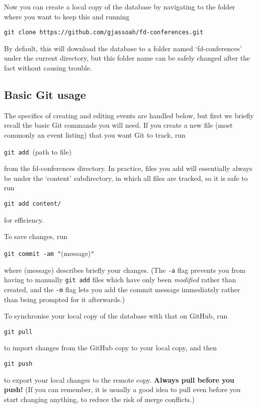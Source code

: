 \documentclass[12pt]{scrartcl}
\theoremstyle{definition}
\begin{document}
Now you can create a local copy of the database by navigating to the folder where you want to keep this and running
\begin{center}
\verb|git clone https://github.com/gjassoah/fd-conferences.git|
\end{center}
By default, this will download the database to a folder named `fd-conferences' under the current directory, but this folder name can be safely changed after the fact without causing trouble.

\subsection{Basic Git usage}
\label{s:basic_Git}
The specifics of creating and editing events are handled below, but first we briefly recall the basic Git commands you will need.
If you create a new file (most commonly an event listing) that you want Git to track, run
\begin{center}
\noindent\verb|git add |(path to file)
\end{center}
from the fd-conferences directory.
In practice, files you add will essentially always be under the `content' subdirectory, in which all files are tracked, so it is safe to run
\begin{center}
\verb|git add content/|
\end{center}
for efficiency.

To save changes, run
\begin{center}
\verb|git commit -am "|(message)\verb|"|
\end{center}
where (message) describes briefly your changes.
(The \verb|-a| flag prevents you from having to manually \verb|git add| files which have only been \emph{modified} rather than created, and the \verb|-m| flag lets you add the commit message immediately rather than being prompted for it afterwards.)

To synchronise your local copy of the database with that on GitHub, run
\begin{center}
\verb|git pull|
\end{center}
to import changes from the GitHub copy to your local copy, and then
\begin{center}
\verb|git push|
\end{center}
to export your local changes to the remote copy.
\textbf{Always pull before you push!} (If you can remember, it is usually a good idea to pull even before you start changing anything, to reduce the risk of merge conflicts.)
\end{document}

